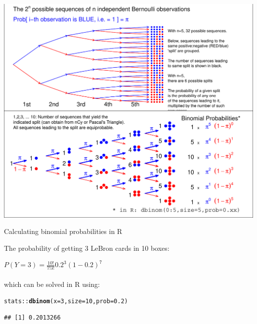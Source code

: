 \documentclass[10pt,handout]{beamer}\usepackage[]{graphicx}\usepackage[]{color}
\makeatletter
\def\maxwidth{ %
  \ifdim\Gin@nat@width>\linewidth
    \linewidth
  \else
    \Gin@nat@width
  \fi
}
\newcommand{\hlnum}[1]{\textcolor[rgb]{0.686,0.059,0.569}{#1}}%
\newcommand{\hlopt}[1]{\textcolor[rgb]{0,0,0}{#1}}%
\newcommand{\hlstd}[1]{\textcolor[rgb]{0.345,0.345,0.345}{#1}}%
\newcommand{\hlkwc}[1]{\textcolor[rgb]{0.333,0.667,0.333}{#1}}%
\newcommand{\hlkwd}[1]{\textcolor[rgb]{0.737,0.353,0.396}{\textbf{#1}}}%
\newenvironment{kframe}{%
 \def\at@end@of@kframe{}%
 \ifinner\ifhmode%
  \def\at@end@of@kframe{\end{minipage}}%
  \begin{minipage}{\columnwidth}%
 \fi\fi%
 \def\FrameCommand##1{\hskip\@totalleftmargin \hskip-\fboxsep
 \colorbox{shadecolor}{##1}\hskip-\fboxsep
     \hskip-\linewidth \hskip-\@totalleftmargin \hskip\columnwidth}%
 \MakeFramed {\advance\hsize-\width
   \@totalleftmargin\z@ \linewidth\hsize
   \@setminipage}}%
 {\par\unskip\endMakeFramed%
 \at@end@of@kframe}
\newenvironment{knitrout}{}{} %
\makeatother
\begin{document}
\begin{frame}[fragile]{}
\begin{knitrout}\tiny
{}\color{fgcolor}

{\centering \includegraphics[width=\maxwidth]{figure/unnamed-chunk-3-1} 

}


\end{knitrout}
\end{frame}


\begin{frame}[fragile]{Calculating binomial probabilities in R}
	
	The probability of getting 3 LeBron cards in 10 boxes:
	
	\vspace{.21in}
	
	$P(Y=3) = \frac{10!}{7!3!}0.2^3(1-0.2)^{7}$ \\ \ \\
	which can be solved in R using:
\begin{knitrout}\tiny
{}\color{fgcolor}\begin{kframe}
\begin{alltt}
\hlstd{stats}\hlopt{::}\hlkwd{dbinom}\hlstd{(}\hlkwc{x} \hlstd{=} \hlnum{3}\hlstd{,} \hlkwc{size} \hlstd{=} \hlnum{10}\hlstd{,} \hlkwc{prob} \hlstd{=} \hlnum{0.2}\hlstd{)}
\end{alltt}
\begin{verbatim}
## [1] 0.2013266
\end{verbatim}
\end{kframe}
\end{knitrout}
\end{frame}
\end{document}
